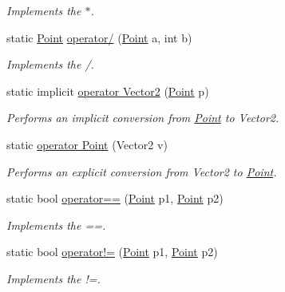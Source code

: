 \begin{DoxyCompactItemize}
\begin{DoxyCompactList}\small\item\em Implements the $\ast$. \end{DoxyCompactList}\item 
static \hyperlink{struct_lerp2_a_p_i_1_1_optimizers_1_1_point}{Point} \hyperlink{struct_lerp2_a_p_i_1_1_optimizers_1_1_point_ad397681f2cd319fdbc4b004bd00a2ddd}{operator/} (\hyperlink{struct_lerp2_a_p_i_1_1_optimizers_1_1_point}{Point} a, int b)
\begin{DoxyCompactList}\small\item\em Implements the /. \end{DoxyCompactList}\item 
static implicit \hyperlink{struct_lerp2_a_p_i_1_1_optimizers_1_1_point_a1ee49d81f587872a75d81c7193f10e00}{operator Vector2} (\hyperlink{struct_lerp2_a_p_i_1_1_optimizers_1_1_point}{Point} p)
\begin{DoxyCompactList}\small\item\em Performs an implicit conversion from \hyperlink{struct_lerp2_a_p_i_1_1_optimizers_1_1_point}{Point} to Vector2. \end{DoxyCompactList}\item 
static \hyperlink{struct_lerp2_a_p_i_1_1_optimizers_1_1_point_ab36715b8d85d310ff9dee651fdddaf31}{operator Point} (Vector2 v)
\begin{DoxyCompactList}\small\item\em Performs an explicit conversion from Vector2 to \hyperlink{struct_lerp2_a_p_i_1_1_optimizers_1_1_point}{Point}. \end{DoxyCompactList}\item 
static bool \hyperlink{struct_lerp2_a_p_i_1_1_optimizers_1_1_point_ae4335b232db05f2c71089b204fe72218}{operator==} (\hyperlink{struct_lerp2_a_p_i_1_1_optimizers_1_1_point}{Point} p1, \hyperlink{struct_lerp2_a_p_i_1_1_optimizers_1_1_point}{Point} p2)
\begin{DoxyCompactList}\small\item\em Implements the ==. \end{DoxyCompactList}\item 
static bool \hyperlink{struct_lerp2_a_p_i_1_1_optimizers_1_1_point_a255a4310af64ddc4c2e5a6dd42cc4172}{operator!=} (\hyperlink{struct_lerp2_a_p_i_1_1_optimizers_1_1_point}{Point} p1, \hyperlink{struct_lerp2_a_p_i_1_1_optimizers_1_1_point}{Point} p2)
\begin{DoxyCompactList}\small\item\em Implements the !=. \end{DoxyCompactList}\end{DoxyCompactItemize}
